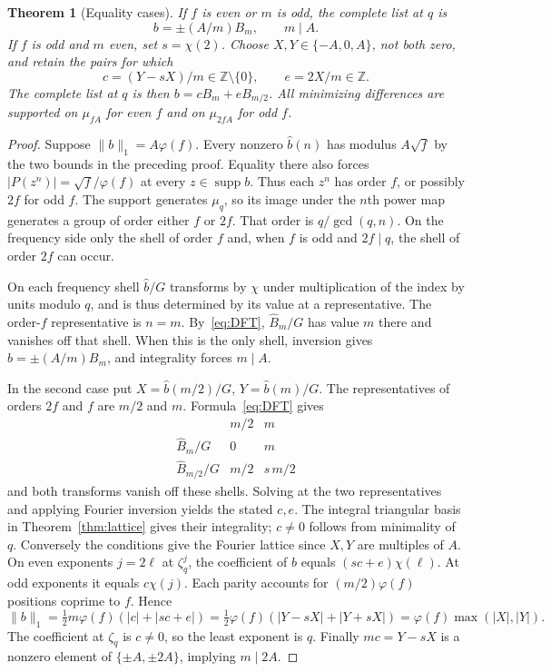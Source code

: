 \documentclass[11pt,letterpaper]{article}
\newtheorem{theorem}{Theorem}[section]
\newcommand{\Z}{\mathbb Z}
\newcommand{\supp}{\operatorname{supp}}
\begin{document}
\begin{theorem}[Equality cases]\label{thm:eq}
If $f$ is even or $m$ is odd, the complete list at $q$ is
\[
            b=\pm(A/m)B_m,\qquad m\mid A.
\]
If $f$ is odd and $m$ even, set $s=\chi(2)$. Choose $X,Y\in\{-A,0,A\}$, not both zero, and retain the pairs for which
\[
 c=(Y-sX)/m\in\Z\setminus\{0\},\qquad e=2X/m\in\Z .
\]
The complete list at $q$ is then $b=cB_m+eB_{m/2}$. All minimizing differences are supported on $\mu_{fA}$ for even $f$ and on $\mu_{2fA}$ for odd $f$.
\end{theorem}
\begin{proof}
Suppose $\|b\|_1=A\varphi(f)$. Every nonzero $\widehat b(n)$ has modulus $A\sqrt f$ by the two bounds in the preceding proof. Equality there also forces $|P(z^n)|=\sqrt f/\varphi(f)$ at every $z\in\supp b$. Thus each $z^n$ has order $f$, or possibly $2f$ for odd $f$. The support generates $\mu_q$, so its image under the $n$th power map generates a group of order either $f$ or $2f$. That order is $q/\gcd(q,n)$. On the frequency side only the shell of order $f$ and, when $f$ is odd and $2f\mid q$, the shell of order $2f$ can occur.

On each frequency shell $\widehat b/G$ transforms by $\chi$ under multiplication of the index by units modulo $q$, and is thus determined by its value at a representative. The order-$f$ representative is $n=m$. By~\eqref{eq:DFT}, $\widehat B_m/G$ has value $m$ there and vanishes off that shell. When this is the only shell, inversion gives $b=\pm(A/m)B_m$, and integrality forces $m\mid A$.

In the second case put $X=\widehat b(m/2)/G$, $Y=\widehat b(m)/G$. The representatives of orders $2f$ and $f$ are $m/2$ and $m$. Formula~\eqref{eq:DFT} gives
\[
 \begin{array}{c|cc}
                 &m/2&m\\ \hline
 \widehat B_m/G  &0&m\\
 \widehat B_{m/2}/G &m/2&s\,m/2
 \end{array}
\]
and both transforms vanish off these shells. Solving at the two representatives and applying Fourier inversion yields the stated $c,e$. The integral triangular basis in Theorem~\ref{thm:lattice} gives their integrality; $c\ne0$ follows from minimality of $q$. Conversely the conditions give the Fourier lattice since $X,Y$ are multiples of $A$. On even exponents $j=2\ell$ at $\zeta_q^j$, the coefficient of $b$ equals $(sc+e)\chi(\ell)$. At odd exponents it equals $c\chi(j)$. Each parity accounts for $(m/2)\varphi(f)$ positions coprime to $f$. Hence
\[
 \|b\|_1=\tfrac12m\varphi(f)(|c|+|sc+e|)
 =\tfrac12\varphi(f)(|Y-sX|+|Y+sX|)
 =\varphi(f)\max(|X|,|Y|).
\]
The coefficient at $\zeta_q$ is $c\ne0$, so the least exponent is $q$. Finally $mc=Y-sX$ is a nonzero element of $\{\pm A,\pm2A\}$, implying $m\mid2A$.
\end{proof}
\end{document}
